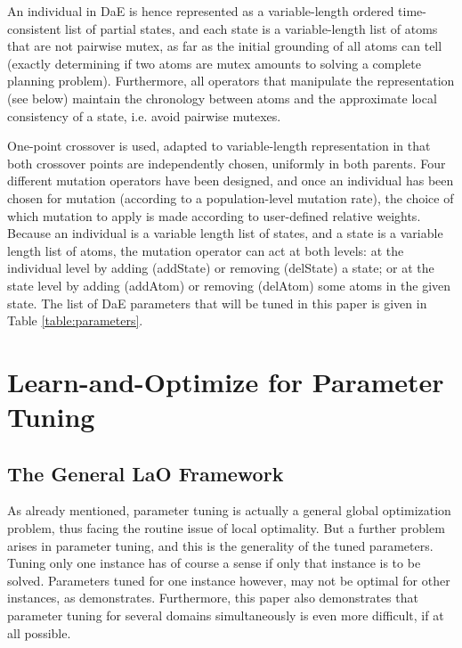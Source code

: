 \documentclass[runningheads,a4paper]{llncs}
\begin{document}
An individual in DaE is hence represented as a variable-length ordered time-consistent list of partial states, and each state is a variable-length list of atoms that are not pairwise mutex, as far as the initial grounding of all atoms  can tell (exactly determining if two atoms are mutex amounts to solving a complete planning problem). Furthermore, all operators that manipulate the representation (see below) maintain the chronology between atoms and the approximate local consistency of a state, i.e. avoid pairwise mutexes.

One-point crossover is used, adapted to variable-length representation in that both crossover points are independently chosen, uniformly in both parents.
Four different mutation operators have been designed, and once an individual has been chosen for mutation (according to a population-level mutation rate), the choice of which mutation to apply is made according to user-defined relative weights. 
Because an individual is a variable length list of states, and a state is a variable length list of atoms, the mutation 
operator can act at both levels: at the individual level by adding (addState) or removing (delState) 
a state; or at the state level by adding (addAtom) or removing (delAtom) some atoms in the given state. 
The list of DaE parameters that will be tuned in this paper is given in Table \ref{table:parameters}.


\section{Learn-and-Optimize for Parameter Tuning}
\label{section:LaO}

\subsection{The General LaO Framework}

As already mentioned, parameter tuning is actually a general global optimization problem, thus facing the routine issue of local optimality. But a further problem arises in parameter tuning, and this is the generality of the tuned parameters. Tuning only one instance has of course a sense if only that instance is to be solved. Parameters tuned for one instance however, may not be optimal for other instances, as \cite{BibGECCO:2010} demonstrates. Furthermore, this paper also demonstrates that parameter tuning for several domains simultaneously is even more difficult, if at all possible.
\end{document}
